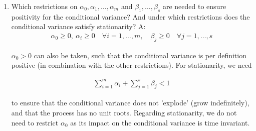 \documentclass{article}
\begin{document}
\begin{enumerate}
\begin{align}
    \Rightarrow l(\alpha, \beta) &= \log L(\alpha, \beta) \\
    &= -\frac{t}{2} \log(2\pi) - \frac{1}{2} \sum_{j=1}^t \log(\sigma_j^2) - \frac{1}{2} \sum_{j=1}^t \frac{\varepsilon_j^2}{\sigma_j^2}
    \end{align}
    \begin{align}
    \Rightarrow f.o.c.'s : \quad \frac{\partial l(\alpha, \beta)}{\partial \alpha_0} &= -\frac{1}{2} \sum_{j=1}^t \frac{1}{\sigma_j^2} - \frac{\varepsilon_j^2}{\sigma_j^4} = 0 \\
    \frac{\partial l(\alpha, \beta)}{\partial \alpha_i} &= 0 \quad \text{for} \quad i = 1, \dots, m \\
    \frac{\partial l(\alpha, \beta)}{\partial \beta_j} &= 0 \quad \text{for} \quad j = 1, \dots, s
    \end{align}

    \newpage
    \item[(c)] Which restrictions on $\alpha_0, \alpha_1, \dots, \alpha_m$ and $\beta_1, \dots, \beta_s$ are needed to ensure positivity for the conditional variance? And under which restrictions does the conditional variance satisfy stationarity? \newline\newline
    A:
    \begin{align}
    \alpha_{0} \geq 0, \ \alpha_{i} \geq 0 \quad \forall i=1, \dots, m, \quad \beta_{j} \geq 0 \quad \forall j=1, \dots, s
    \end{align}
    
    $\alpha_{0} > 0$ can also be taken, such that the conditional variance is per definition positive (in combination with the other restrictions). For stationarity, we need
    
    \begin{align}
    \sum_{i=1}^{m} \alpha_{i} + \sum_{j=1}^{s} \beta_{j} < 1
    \end{align}
    
    to ensure that the conditional variance does not 'explode' (grow indefinitely), and that the process has no unit roots. Regarding stationarity, we do not need to restrict $\alpha_{0}$ as its impact on the conditional variance is time invariant.
\end{enumerate}

\newpage
\end{document}
